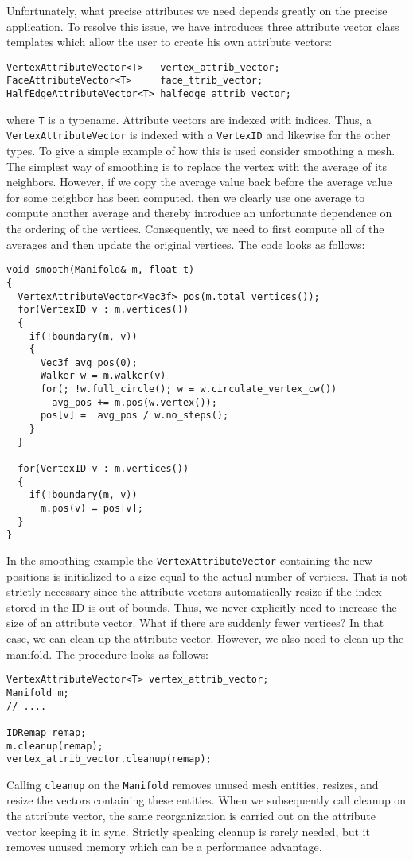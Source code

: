 \documentclass[a4paper]{article}
\begin{document}
Unfortunately, what precise attributes we need depends greatly on the precise application. To resolve this issue, we have introduces three attribute vector class templates which allow the user to create his own attribute vectors:
\begin{verbatim}
VertexAttributeVector<T>   vertex_attrib_vector; 
FaceAttributeVector<T>     face_ttrib_vector;
HalfEdgeAttributeVector<T> halfedge_attrib_vector;
\end{verbatim}
where \texttt{T} is a typename. Attribute vectors are indexed with indices. Thus, a
\texttt{VertexAttributeVector} is indexed with a \texttt{VertexID} and likewise for the other types. To give a simple example of how this is used consider smoothing a mesh. The simplest way of smoothing is to replace the vertex with the average of its neighbors. However, if we copy the average value back before the average value for some neighbor has been computed, then we clearly use one average to compute another average and thereby introduce an unfortunate dependence on the ordering of the vertices. Consequently, we need to first compute all of the averages and then update the original vertices. The code looks as follows:
\begin{verbatim}
void smooth(Manifold& m, float t)
{
  VertexAttributeVector<Vec3f> pos(m.total_vertices());
  for(VertexID v : m.vertices())
  { 
    if(!boundary(m, v))
    {
      Vec3f avg_pos(0);
      Walker w = m.walker(v)
      for(; !w.full_circle(); w = w.circulate_vertex_cw())
        avg_pos += m.pos(w.vertex());
      pos[v] =  avg_pos / w.no_steps();
    }
  }
  
  for(VertexID v : m.vertices())
  {
    if(!boundary(m, v))
      m.pos(v) = pos[v];
  }
}
\end{verbatim}

In the smoothing example the \texttt{VertexAttributeVector} containing the new positions is initialized to a size equal to the actual number of vertices. That is not strictly necessary since the attribute vectors automatically resize if the index stored in the ID is out of bounds. Thus, we never explicitly need to increase the size of an attribute vector. What if there are suddenly fewer vertices? In that case, we can clean up the attribute vector. However, we also need to clean up the manifold. The procedure looks as follows:
\begin{verbatim}
VertexAttributeVector<T> vertex_attrib_vector; 
Manifold m;
// ....

IDRemap remap;
m.cleanup(remap);
vertex_attrib_vector.cleanup(remap);
\end{verbatim}
Calling \texttt{cleanup} on the \texttt{Manifold} removes unused mesh entities, resizes, and resize the vectors containing these entities. When we subsequently call cleanup on the attribute vector, the same reorganization is carried out on the attribute vector keeping it in sync. Strictly speaking cleanup is rarely needed, but it removes unused memory which can be a performance advantage.
\end{document}
